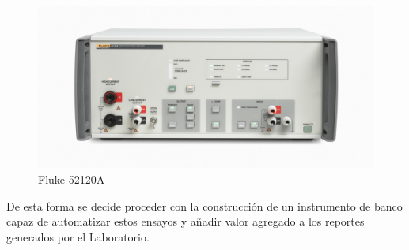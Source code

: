 \documentclass[../informe.tex]{subfiles}
\begin{document}
    \begin{figure}[!htbp]
        \centering
        \includegraphics[scale=0.7]{images/fluke-52120a-foto.jpg}
        \caption{Fluke 52120A}
        \label{fig:fluke-52120a-foto}
    \end{figure}

De esta forma se decide proceder con la construcción de un instrumento de banco capaz de automatizar estos ensayos y añadir valor agregado a los reportes generados por el Laboratorio.

\end{document}
